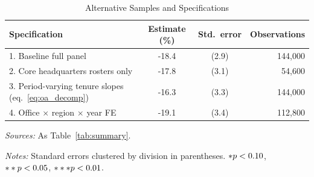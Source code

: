 \begin{table}[!htbp]
\centering
\caption{Alternative Samples and Specifications}\label{tab:oa_checks}
\begin{threeparttable}
\footnotesize
\setlength{\tabcolsep}{5.5pt}
\begin{tabular}{l S[table-format=-2.1,table-space-text-post={\sym{***}}] c r}
\toprule
Specification & {Estimate (\%)} & Std.\ error & {Observations} \\
. Baseline full panel                      & -18.4\sym{***} & (2.9) & 144,000 \\
2. Core headquarters rosters only           & -17.8\sym{***} & (3.1) &  54,600 \\
3. Period-varying tenure slopes (eq.~\ref{eq:oa_decomp}) & -16.3\sym{***} & (3.3) & 144,000 \\
4. Office $\times$ region $\times$ year FE  & -19.1\sym{***} & (3.4) & 112,800 \\
\bottomrule
\end{tabular}
\begin{ecofintablenotes}
\item \textit{Sources:} As Table~\ref{tab:summary}.
\item \textit{Notes:} Standard errors clustered by division in parentheses. $*p<0.10$, $**p<0.05$, $***p<0.01$.
\end{ecofintablenotes}
\end{threeparttable}
\end{table}
